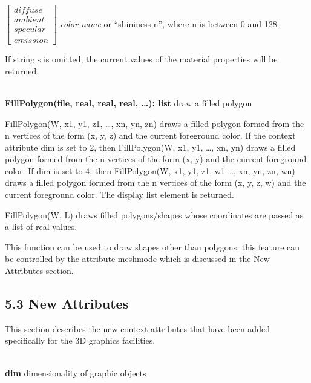 \documentclass[letterpaper]{article}
\begin{document}
$\left[
\begin{array}{l}
diffuse\\ambient\\specular\\emission
\end{array}
\right]$ \textsf{\textit{color name}} or \textsf{``shininess n''},
where \textsf{n} is between \textsf{0} and \textsf{128}.

If string s is omitted, the current values of the material properties
will be returned.


\noindent\hrulefill\\
\noindent\textsf{\textbf{FillPolygon(file, real, real, real, {\dots}): list}}
\hfill draw a filled polygon


\bigskip

{
\textsf{FillPolygon(W, x1, y1, z1, {\dots}, xn, yn, zn)} draws a filled polygon formed from the n vertices of the form
(x, y, z) and the current foreground color. If the context attribute \textsf{dim} is set to 2, then
\textsf{FillPolygon(W, x1, y1, {\dots}, xn, yn)} draws a filled polygon formed from the n vertices of the form (x, y)
and the current foreground color. If \textsf{dim} is set to 4, then \textsf{FillPolygon(W, x1, y1, z1, w1 {\dots}, xn,
yn, zn, wn)} draws a filled polygon formed from the n vertices of the form (x, y, z, w) and the current foreground
color. The display list element is returned. }

{
FillPolygon(W, L) draws filled polygons/shapes whose coordinates are passed as a list of real values.}


\bigskip

{
This function can be used to draw shapes other than polygons, this feature can be controlled by the attribute
\textsf{meshmode} which is discussed in the New Attributes section.}


\bigskip

\subsection[5.3 New Attributes]{5.3 New Attributes}


\bigskip

{
This section describes the new context attributes that have been added specifically for the 3D graphics facilities. }


\bigskip

\noindent\hrulefill\\
\noindent\textsf{\textbf{dim}} \hfill dimensionality of graphic
objects
\end{document}
